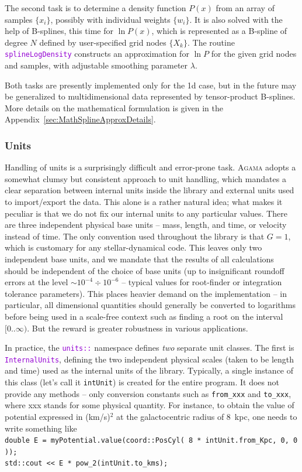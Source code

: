 \documentclass[12pt]{article}
\newcommand{\Agama}{\textsc{Agama}\xspace}
\newcommand{\ttt}[1]{\textcolor{darkviolet}{\texttt{#1}}}
\begin{document}
The second task is to determine a density function $P(x)$ from an array of samples $\{x_i\}$, possibly with individual weights $\{w_i\}$. It is also solved with the help of B-splines, this time for $\ln P(x)$, which is represented as a B-spline of degree $N$ defined by user-specified grid nodes $\{X_k\}$. The routine \ttt{splineLogDensity} constructs an approximation for $\ln P$ for the given grid nodes and samples, with adjustable smoothing parameter $\lambda$.

Both tasks are presently implemented only for the 1d case, but in the future may be generalized to multidimensional data represented by tensor-product B-splines. More details on the mathematical formulation is given in the Appendix~\ref{sec:MathSplineApproxDetails}.

\subsubsection{Units}  \label{sec:Units}

Handling of units is a surprisingly difficult and error-prone task. \Agama adopts a somewhat clumsy but consistent approach to unit handling, which mandates a clear separation between internal units inside the library and external units used to import/export the data. This alone is a rather natural idea; what makes it peculiar is that we do not fix our internal units to any particular values. There are three independent physical base units -- mass, length, and time, or velocity instead of time. The only convention used throughout the library is that $G=1$, which is customary for any stellar-dynamical code. This leaves only two independent base units, and we mandate that the results of all calculations should be independent of the choice of base units (up to insignificant roundoff errors at the level $\sim 10^{-4}\div 10^{-6}$ -- typical values for root-finder or integration tolerance parameters). This places heavier demand on the implementation -- in particular, all dimensional quantities should generally be converted to logarithms before being used in a scale-free context such as finding a root on the interval $[0..\infty)$. But the reward is greater robustness in various applications.

In practice, the \ttt{units::} namespace defines \textit{two} separate unit classes. The first is \ttt{InternalUnits}, defining the two independent physical scales (taken to be length and time) used as the internal units of the library. Typically, a single instance of this class (let's call it \texttt{intUnit}) is created for the entire program. It does not provide any methods -- only conversion constants such as \texttt{from_xxx} and \texttt{to_xxx}, where xxx stands for some physical quantity. For instance, to obtain the value of potential expressed in (km/s)${}^2$ at the galactocentric radius of 8~kpc, one needs to write something like \\
\texttt{double E = myPotential.value(coord::PosCyl( 8 * intUnit.from_Kpc, 0, 0 ));}\\
\texttt{std::cout << E * pow_2(intUnit.to_kms);}
\end{document}
